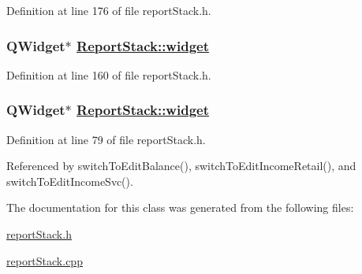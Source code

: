 Definition at line 176 of file report\-Stack.h.\hypertarget{classReportStack_r80}{
\subsubsection[widget]{\setlength{\rightskip}{0pt plus 5cm}QWidget$\ast$ \hyperlink{classReportStack_r8}{Report\-Stack::widget}}}
\label{classReportStack_r80}


Definition at line 160 of file report\-Stack.h.\hypertarget{classReportStack_r8}{
\subsubsection[widget]{\setlength{\rightskip}{0pt plus 5cm}QWidget$\ast$ \hyperlink{classReportStack_r8}{Report\-Stack::widget}}}
\label{classReportStack_r8}


Definition at line 79 of file report\-Stack.h.

Referenced by switch\-To\-Edit\-Balance(), switch\-To\-Edit\-Income\-Retail(), and switch\-To\-Edit\-Income\-Svc().

The documentation for this class was generated from the following files:\begin{CompactItemize}
\item 
\hyperlink{reportStack_8h}{report\-Stack.h}\item 
\hyperlink{reportStack_8cpp}{report\-Stack.cpp}\end{CompactItemize}
